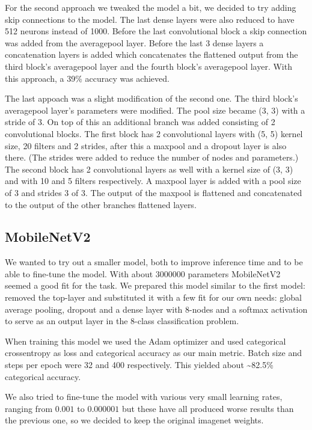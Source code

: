 \documentclass[twocolumn]{article}
\begin{document}
	For the second approach we tweaked the model a bit, we decided to try adding skip connections to the model. The last dense layers were also reduced to have 512 neurons instead of 1000.
	Before the last convolutional block a skip connection was added from the averagepool layer. Before the last 3 dense layers a concatenation layers is added which concatenates the flattened output from the third block's averagepool layer and the fourth block's averagepool layer.
	With this approach, a 39\% accuracy was achieved.
	
	The last appoach was a slight modification of the second one.
	The third block's averagepool layer's parameters were modified. The pool size became (3, 3) with a stride of 3. On top of this an additional branch was added consisting of 2 convolutional blocks. The first block has 2 convolutional layers with (5, 5) kernel size, 20 filters and 2 strides, after this a maxpool and a dropout layer is also there. (The strides were added to reduce the number of nodes and parameters.) 
	The second block has 2 convolutional layers as well with a kernel size of (3, 3) and with 10 and 5 filters respectively. A maxpool layer is added with a pool size of 3 and strides 3 of 3. The output of the maxpool is flattened and concatenated to the output of the other branches flattened layers.
	
	
	\subsection{MobileNetV2}
	
	We wanted to try out a smaller model, both to improve inference time and to be able to fine-tune the model. With about $3000000$ parameters MobileNetV2 seemed a good fit for the task. We prepared this model similar to the first model: removed the top-layer and substituted it with a few fit for our own needs: global average pooling, dropout and a dense layer with 8-nodes and a softmax activation to serve as an output layer in the 8-class classification problem.
	
	When training this model we used the Adam optimizer and used categorical crossentropy as loss and categorical accuracy as our main metric. Batch size and steps per epoch were 32 and 400 respectively. This yielded about \textasciitilde82.5\% categorical accuracy.
	
	We also tried to fine-tune the model with various very small learning rates, ranging from $0.001$ to $0.000001$ but these have all produced worse results than the previous one, so we decided to keep the original imagenet weights.
	
\end{document}
